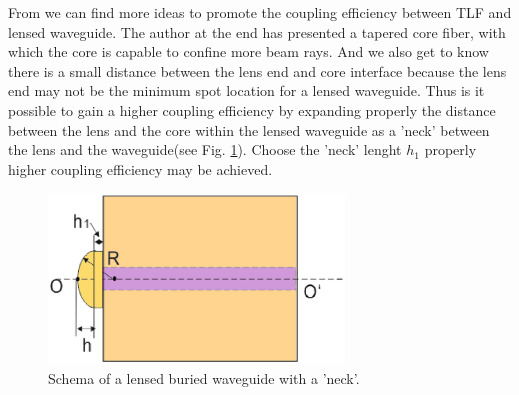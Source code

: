 From \cite{integrated_coupling_between_LD_SMF} we can find more ideas to promote the coupling efficiency between TLF and lensed waveguide. The author at the end has presented a tapered core fiber, with which the core is capable to confine more beam rays. And we also get to know there is a small distance between the lens end and core interface because the lens end may not be the minimum spot location for a lensed waveguide. Thus is it possible to gain a higher coupling efficiency by expanding properly the distance between the lens and the core within the lensed waveguide as a 'neck' between the lens and the waveguide(see Fig. \ref{fig:lensed_waveguide_neck}). Choose the 'neck' lenght $h_{1}$ properly higher coupling efficiency may be achieved.

\begin{figure}[!ht]
\centering
\includegraphics[width=0.7\textwidth]{bilder/lensed_waveguide_neck}
\caption{Schema of a lensed buried waveguide with a 'neck'.}
\label{fig:lensed_waveguide_neck}
\end{figure}
